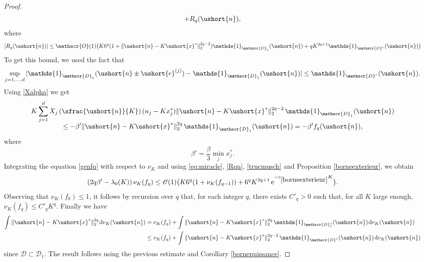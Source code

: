 \documentclass[JEP,XML,SOM,Unicode]{cedram}
\newcommand{\scaleto}[2]{#1}
\let\mathcal\mathscr
\numberwithin{equation}{section}
\theoremstyle{plain}
\theoremstyle{definition}
\newcommand{\pcte}[1]{c_{\eqref{#1}}}
\newcommand{\Oun}{\mathcal{O}(1)}
\newcommand{\un}{\mathds{1}}
\newcommand{\vecn}{\ushort{n}}
\newcommand{\vecxf}{\ushort{x}^*}
\newcommand{\vece}[1]{\ushort{e}^{(#1)}}
\newcommand{\nuk}{\nu_{K}}\let\snuk\nuk
\newcommand{\e}{\operatorname{e}}
\newcommand{\dd}{\hspace{1pt}\mathrm{d}}
\begin{document}
\begin{proof}
\begin{equation}
+R_q(\vecn),
\end{equation}
where
\begin{equation}\label{Rqn}
|R_q(\vecn)|\leq \Oun\bigl(K 6^q (1+\|\vecn-K\vecxf\|_{2}^{\scaleto{2q-2}{5.3pt}}) \un_{\mathcal{D}_1}(\vecn) + q K^{2q+1} \un_{\mathcal{D}^c}(\vecn)\bigr)
\end{equation}
To get this bound, we used the fact that
\[
\sup_{j=1,\ldots, d} |\un_{\mathcal{D}_1}(\vecn\pm \vece{j})-\un_{\mathcal{D}_1}(\vecn)|\leq \un_{\mathcal{D}^c}(\vecn).
\]
Using \eqref{Xalpha} we get
\begin{multline}\label{trucmusch}
K \sum_{j=1}^d X_j\left(\sfrac{\vecn}{K}\right) (n_j-Kx_j^*) \|\vecn - K\vecxf\|_{2}^{\scaleto{2q-2}{5.3pt}} \,\un_{\mathcal{D}_1}(\vecn)\\[-5pt]
\leq -\beta' \|\vecn - K\vecxf\|_{2}^{\scaleto{2q}{5.3pt}} \,\un_{\mathcal{D}_1}(\vecn) = -\beta' f_q(\vecn),
\end{multline}
where
\[
\beta'= \frac{\beta}{3} \min_j x_j^*.
\]
Integrating the equation \eqref{genfq} with respect to $\nuk$ and using \eqref{eq:miracle}, \eqref{Rqn}, \eqref{trucmusch} and Proposition \ref{borneexterieur},
we obtain
\[
(2q\beta'-\lambda_0(K))\,\nuk(f_q)\leq \Oun\bigl(K 6^q(1+\nuk(f_{q-1}))+ 6^q K^{2q+1} \e^{-\pcte{borneexterieur} K}\bigr).
\]
Observing that $\nuk(f_0)\leq 1$, it follows by recursion over $q$ that, for each integer $q$, there exists $C'_q>0$
such that, for all $K$ large enough, $\nuk(f_q)\leq C'_q K^q$. Finally we have
\begin{align*}
\int \|\vecn-K\vecxf\|_{2}^{\scaleto{2q}{5.3pt}} \dd\nuk(\vecn)
& = \nuk(f_q) +\int \|\vecn-K\vecxf\|_{2}^{\scaleto{2q}{5.3pt}}\,\un_{\mathcal{D}_1^c}(\vecn) \dd\nuk(\vecn)\\
& \leq \nuk(f_q) +\int\|\vecn-K\vecxf\|_{2}^{\scaleto{2q-2}{5.3pt}}\,\un_{\mathcal{D}^c}(\vecn)\dd\nuk(\vecn)
\end{align*}
since $\mathcal{D}\subset \mathcal{D}_1$.
The result follows using the previous estimate and Corollary \ref{bornepuissance}.
\end{proof}
\end{document}
